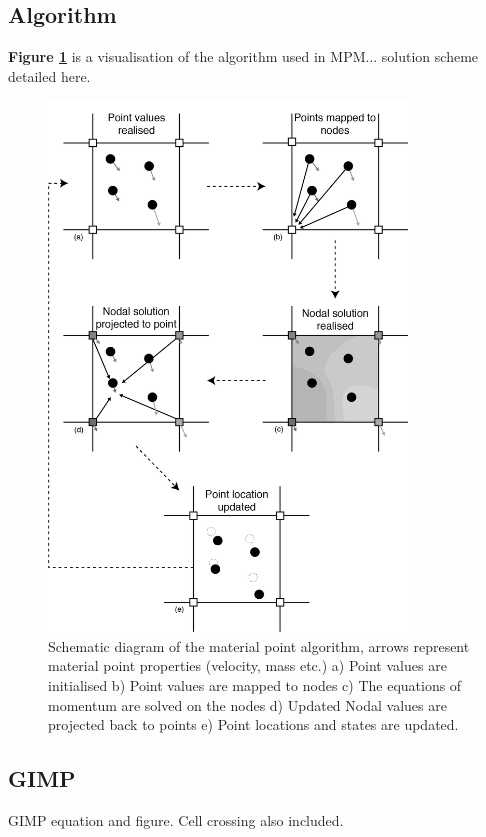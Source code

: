 \subsection{Algorithm}
{\bfseries Figure \ref{fig:nodal}} is a visualisation of the algorithm used in MPM... solution scheme detailed here.

\begin{figure}[H]
\centering
\includegraphics[width=0.85\textwidth]{nodal.png}
\caption{\label{fig:nodal}Schematic diagram of the material point algorithm, arrows represent material point properties (velocity, mass etc.) a) Point values are initialised b) Point values are mapped to nodes c) The equations of momentum are solved on the nodes d) Updated Nodal values are projected back to points e) Point locations and states are updated.}
\end{figure}

\subsection{GIMP}
GIMP equation and figure. Cell crossing also included.





